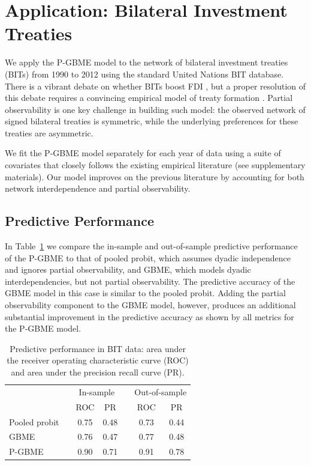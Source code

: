 \section{Application: Bilateral Investment Treaties}

We apply the P-GBME model to the network of bilateral investment treaties (BITs) from 1990 to 2012 using the standard United Nations BIT database. There is a vibrant debate on whether BITs boost FDI \citep{jandhyala:etal:2011, simmons:2014,minhas:2016}, but a proper resolution of this debate requires a convincing empirical model of treaty formation \citep{rosendorff:shin:2012}. Partial observability is one key challenge in building such model: the observed network of signed bilateral treaties is symmetric, while the underlying preferences for these treaties are  asymmetric. 

We fit the P-GBME model separately for each year of data using a suite of covariates that closely follows  the existing empirical literature (see supplementary materials). Our model improves on the previous literature by accounting for both network interdependence and partial observability. 

\subsection{Predictive Performance}

In Table~\ref{tab:perfAssess} we compare the in-sample and out-of-sample predictive performance of the P-GBME to that of pooled probit, which assumes dyadic independence and ignores partial observability, and GBME, which models dyadic interdependencies, but not partial observability. The predictive accuracy of the GBME model in this case is similar to the pooled probit. Adding the partial observability component to the GBME model, however, produces an additional substantial improvement in the predictive accuracy as shown by all metrics for the P-GBME model.

\begin{table}[h!]
\centering
\begin{tabular}{lcccccc}
\toprule
& & \multicolumn{2}{c}{In-sample} & & \multicolumn{2}{c}{Out-of-sample} \\
\cmidrule{3-4}\cmidrule{6-7}
& & ROC & PR & & ROC & PR\\
\midrule
Pooled probit& & 0.75 & 0.48 &  & 0.73 & 0.44\\
GBME && 0.76 & 0.47 & & 0.77 & 0.48 \\
P-GBME && 0.90 & 0.71 & & 0.91 & 0.78 \\
\bottomrule
\end{tabular}
\caption{Predictive performance in BIT data: area under the receiver operating characteristic curve (ROC) and area under the precision recall curve (PR).}
\label{tab:perfAssess}
\end{table} 


